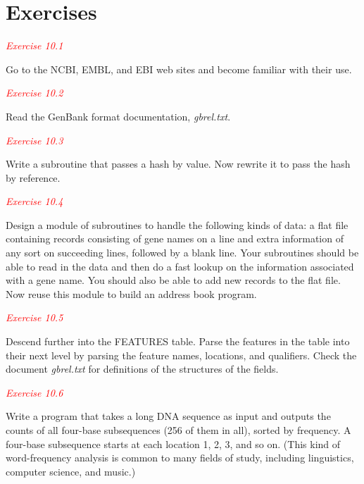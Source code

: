 \section{Exercises}
\textcolor{red}{\textit{Exercise 10.1}}
\begin{adjustwidth}{2em}{}
Go to the NCBI, EMBL, and EBI web sites and become familiar with their use.
\end{adjustwidth}

\textcolor{red}{\textit{Exercise 10.2}}
\begin{adjustwidth}{2em}{}
Read the GenBank format documentation, \textit{gbrel.txt}.
\end{adjustwidth}

\textcolor{red}{\textit{Exercise 10.3}}
\begin{adjustwidth}{2em}{}
Write a subroutine that passes a hash by value. Now rewrite it to pass the hash by reference.
\end{adjustwidth}

\textcolor{red}{\textit{Exercise 10.4}}
\begin{adjustwidth}{2em}{}
Design a module of subroutines to handle the following kinds of data: a flat file containing records consisting of gene names on a line and extra information of any sort on succeeding lines, followed by a blank line. Your subroutines should be able to read in the data and then do a fast lookup on the information associated with a gene name. You should also be able to add new records to the flat file. Now reuse this module to build an address book program.
\end{adjustwidth}

\textcolor{red}{\textit{Exercise 10.5}}
\begin{adjustwidth}{2em}{}
Descend further into the FEATURES table. Parse the features in the table into their next level by parsing the feature names, locations, and qualifiers. Check the document \textit{gbrel.txt} for definitions of the structures of the fields.
\end{adjustwidth}

\textcolor{red}{\textit{Exercise 10.6}}
\begin{adjustwidth}{2em}{}
Write a program that takes a long DNA sequence as input and outputs the counts of all four-base subsequences (256 of them in all), sorted by frequency. A four-base subsequence starts at each location 1, 2, 3, and so on. (This kind of word-frequency analysis is common to many fields of study, including linguistics, computer science, and music.)
\end{adjustwidth}

